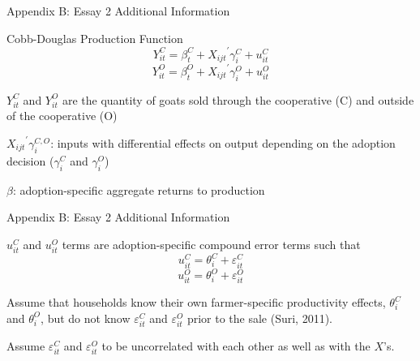 \documentclass[aspectratio=169]{beamer}
\newenvironment{wideitemize}{\itemize\addtolength{\itemsep}{10pt}}{\enditemize}
\begin{document}
\begin{frame}{Appendix B: Essay 2 Additional Information}
        \begin{wideitemize}
        \item Cobb-Douglas Production Function
        \begin{equation} \label{eq:E2_yield.C}
            Y^{C}_{it} = \beta^{C}_{t} + {X_{ijt}}^\prime \gamma^{C}_{i} + u^{C}_{it}
        \end{equation}   
        \begin{equation} \label{eq:E2_yield.O}    
            Y^{O}_{it} = \beta^{O}_{t} + {X_{ijt}}^\prime \gamma^{O}_{i} + u^{O}_{it}
        \end{equation}
        \item $Y^{C}_{it}$ and $Y^{O}_{it}$ are the quantity of goats sold through the cooperative (C) and outside of the cooperative (O)
        \item ${X_{ijt}}^\prime \gamma^{C,O}_{i}$: inputs with differential effects on output depending on the adoption decision ($\gamma^{C}_{i}$ and $\gamma^{O}_{i}$)
        \item $\beta$: adoption-specific aggregate returns to production
    \end{wideitemize}
\end{frame}


\begin{frame}{Appendix B: Essay 2 Additional Information}
    \begin{wideitemize}
        \item $u^{C}_{it}$ and $u^{O}_{it}$ terms are adoption-specific compound error terms such that \vspace{.5cm}
    \end{wideitemize}
    \begin{equation} \label{eq:E2_u.C}
        u^{C}_{it} = \theta^{C}_{i} + \varepsilon^{C}_{it}
    \end{equation}
    \begin{equation} \label{eq:E2_u.O}
        u^{O}_{it} = \theta^{O}_{i} + \varepsilon^{O}_{it}
    \end{equation}
    \begin{wideitemize}
        \item Assume that households know their own farmer-specific productivity effects, $\theta^{C}_{i}$ and $\theta^{O}_{i}$, but do not know $\varepsilon^{C}_{it}$ and $\varepsilon^{O}_{it}$ prior to the sale (Suri, 2011). 
        \item Assume $\varepsilon^{C}_{it}$ and $\varepsilon^{O}_{it}$ to be uncorrelated with each other as well as with the $X$’s.
    \end{wideitemize}
\end{frame}
\end{document}
